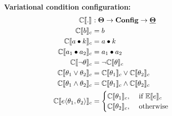 \begin{figure}
\textbf{Variational condition configuration:}
\begin{alignat*}{1}
\ecSem [] . &: \vCondSet \to \confSet \to \pCondSet\\
%
\ecSem \bTag &= \bTag \\
%
\ecSem \vAttOpCte &= 
    \vAttOpCte\\
%
\ecSem \vAttOpAtt &= 
       \vAttOpAtt\\
%
\ecSem {\neg \vCond} &= \neg \ecSem \vCond\\
%
\ecSem {\orr \vCond} &= \ecSem {\vCond_1} \vee \ecSem {\vCond_2}\\
%
\ecSem {\annd \vCond} &= \ecSem {\vCond_1} \wedge \ecSem {\vCond_2}\\
%
\ecSem {\chc {\vCond_1, \vCond_2}} &=
	\begin{cases}
		\ecSem {\vCond_1}, &\text{ if } \fSem \dimMeta  \\
		\ecSem {\vCond_2}, &\text{ otherwise}
	\end{cases}
\end{alignat*}


\end{figure}

